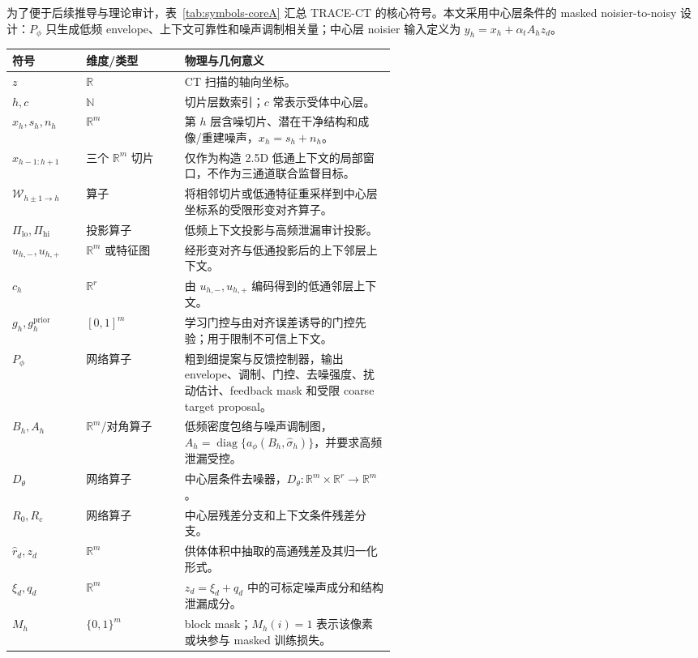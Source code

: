 \documentclass[11pt,a4paper,UTF8,fontset=fandol]{ctexart}
\theoremstyle{definition}
\DeclareMathOperator{\diag}{diag}
\begin{document}
为了便于后续推导与理论审计，表~\ref{tab:symbols-coreA} 汇总 TRACE-CT 的核心符号。本文采用中心层条件的 masked noisier-to-noisy 设计：$P_\phi$ 只生成低频 envelope、上下文可靠性和噪声调制相关量；中心层 noisier 输入定义为 $y_h=x_h+\alpha_tA_hz_d$。

\begin{table}[htbp]
\centering
\small
\begin{tabular}{llp{0.55\linewidth}}
\toprule
符号 & 维度/类型 & 物理与几何意义 \\
\midrule
$z$ & $\mathbb{R}$ & CT 扫描的轴向坐标。 \\
$h,c$ & $\mathbb{N}$ & 切片层数索引；$c$ 常表示受体中心层。 \\
$x_h,s_h,n_h$ & $\mathbb{R}^m$ & 第 $h$ 层含噪切片、潜在干净结构和成像/重建噪声，$x_h=s_h+n_h$。 \\
$x_{h-1:h+1}$ & 三个 $\mathbb R^m$ 切片 & 仅作为构造 2.5D 低通上下文的局部窗口，不作为三通道联合监督目标。 \\
$\mathcal W_{h\pm1\to h}$ & 算子 & 将相邻切片或低通特征重采样到中心层坐标系的受限形变对齐算子。 \\
$\Pi_{\mathrm{lo}},\Pi_{\mathrm{hi}}$ & 投影算子 & 低频上下文投影与高频泄漏审计投影。 \\
$u_{h,-},u_{h,+}$ & $\mathbb R^m$ 或特征图 & 经形变对齐与低通投影后的上下邻层上下文。 \\
$c_h$ & $\mathbb{R}^r$ & 由 $u_{h,-},u_{h,+}$ 编码得到的低通邻层上下文。 \\
$g_h,g_h^{\mathrm{prior}}$ & $[0,1]^m$ & 学习门控与由对齐误差诱导的门控先验；用于限制不可信上下文。 \\
$P_\phi$ & 网络算子 & 粗到细提案与反馈控制器，输出 envelope、调制、门控、去噪强度、扰动估计、feedback mask 和受限 coarse target proposal。 \\
$B_h,A_h$ & $\mathbb R^m$/对角算子 & 低频密度包络与噪声调制图，$A_h=\diag\{a_\phi(B_h,\widehat\sigma_h)\}$，并要求高频泄漏受控。 \\
$D_\theta$ & 网络算子 & 中心层条件去噪器，$D_\theta:\mathbb R^m\times\mathbb R^r\to\mathbb R^m$。 \\
$R_0,R_c$ & 网络算子 & 中心层残差分支和上下文条件残差分支。 \\
$\hat r_d,z_d$ & $\mathbb R^m$ & 供体体积中抽取的高通残差及其归一化形式。 \\
$\xi_d,q_d$ & $\mathbb R^m$ & $z_d=\xi_d+q_d$ 中的可标定噪声成分和结构泄漏成分。 \\
$M_h$ & $\{0,1\}^m$ & block mask；$M_h(i)=1$ 表示该像素或块参与 masked 训练损失。 \\

\end{tabular}
\end{table}
\end{document}

